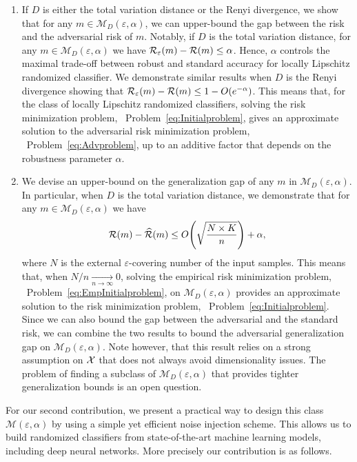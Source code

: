 \begin{enumerate}
    \item If $D$ is either the total variation distance or the Renyi divergence, we show that for any $m  \in \mathcal{M}_D(\varepsilon,\alpha)$, we can upper-bound the gap between the risk and the adversarial risk of $m $. Notably, if $D$ is the total variation distance, for any $m  \in \mathcal{M}_D(\varepsilon,\alpha)$ we have $ \mathcal{R}_\varepsilon(m) - \mathcal{R}(m ) \leq \alpha$. Hence, $\alpha$ controls the maximal trade-off between robust and standard accuracy for locally Lipschitz randomized classifier. We demonstrate similar results when $D$ is the Renyi divergence showing that $\risk_\varepsilon(m) - \risk(m ) \leq 1- O\left(e^{-\alpha}\right)$. This means that, for the class of locally Lipschitz randomized classifiers, solving the risk minimization problem, \ie~Problem~\eqref{eq:Initialproblem}, gives an approximate solution to the adversarial risk minimization problem, \ie~Problem~\eqref{eq:Advproblem}, up to an additive factor that depends on the robustness parameter $\alpha$. 
    
    \item We devise an upper-bound on the generalization gap of any $m $ in $\mathcal{M}_D(\varepsilon,\alpha)$. In particular, when $D$ is the total variation distance, we demonstrate that for any $m  \in \mathcal{M}_D(\varepsilon,\alpha)$ we have $$\risk(m ) - \widehat{\risk}(m ) \leq O\left(\sqrt{\frac{N \times K}{n}}\right) + \alpha,$$ where $N$ is the external $\varepsilon$-covering number of the input samples. This means that, when $N/n \underset{n \rightarrow \infty}{\rightarrow} 0$, solving the empirical risk minimization problem, \ie~Problem~\eqref{eq:EmpInitialproblem}, on $\mathcal{M}_D(\varepsilon,\alpha)$ provides an approximate solution to the risk minimization problem, \ie~Problem~\eqref{eq:Initialproblem}. Since we can also bound the gap between the adversarial and the standard risk, we can combine the two results to bound the adversarial generalization gap on $\mathcal{M}_D(\varepsilon,\alpha)$. Note however, that this result relies on a strong assumption on $\mathcal{X}$ that does not always avoid dimensionality issues. The problem of finding a subclass of $\mathcal{M}_D(\varepsilon,\alpha)$ that provides tighter generalization bounds is an open question.
\end{enumerate}

For our second contribution, we present a practical way to design this class $\mathcal{M}(\varepsilon,\alpha)$ by using a simple yet efficient noise injection scheme. This allows us to build randomized classifiers from state-of-the-art machine learning models, including deep neural networks. More precisely our contribution is as follows.

